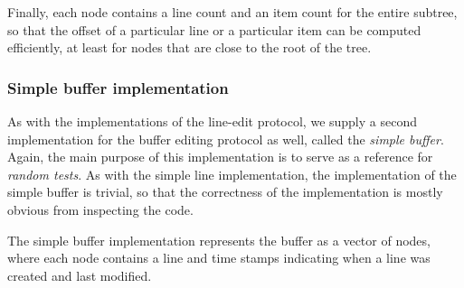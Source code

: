 Finally, each node contains a line count and an item count for the
entire subtree, so that the offset of a particular line or a
particular item can be computed efficiently, at least for nodes that
are close to the root of the tree.

\subsubsection{Simple buffer implementation}

As with the implementations of the line-edit protocol, we supply a
second implementation for the buffer editing protocol as well, called
the \emph{simple buffer}.  Again, the main purpose of this
implementation is to serve as a reference for \emph{random tests}.  As
with the simple line implementation, the implementation of the simple
buffer is trivial, so that the correctness of the implementation is
mostly obvious from inspecting the code.

The simple buffer implementation represents the buffer as a
\commonlisp{} vector of nodes, where each node contains a line and
time stamps indicating when a line was created and last modified.
